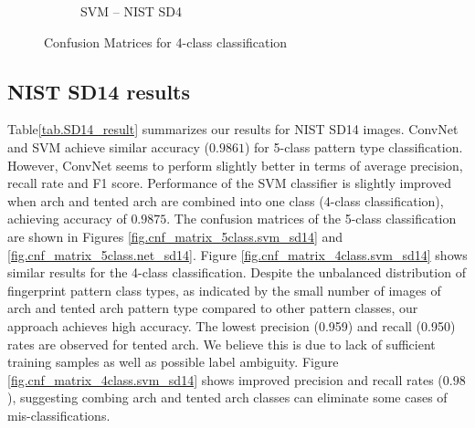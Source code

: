 \begin{figure}[!ht]
\begin{subfigure}[b]{0.25\textwidth}
		\caption{SVM -- NIST SD4}
		\label{fig.cnf_matrix_4class.svm_sd4}
	\end{subfigure}%

	\caption{Confusion Matrices for 4-class classification}\label{fig.cnf_matrix_4class}
\end{figure}

\subsection{NIST SD14 results}
\label{sec_sd14}

 Table\ref{tab.SD14_result} summarizes our results for NIST SD14 images.
%
ConvNet and SVM achieve similar accuracy ($0.9861$) for 5-class pattern type classification. 
%
However, ConvNet seems to perform slightly better in terms of average precision, recall rate and F1 score.
%
Performance of the SVM classifier is slightly improved when arch and tented arch are combined into one class (4-class classification), achieving accuracy of $0.9875$.
%
The confusion matrices of the 5-class classification are shown in Figures \ref{fig.cnf_matrix_5class.svm_sd14} and \ref{fig.cnf_matrix_5class.net_sd14}.
Figure \ref{fig.cnf_matrix_4class.svm_sd14} shows similar results for the 4-class classification.
%
Despite the unbalanced distribution of fingerprint pattern class types, as indicated by the small number of images of arch and tented arch pattern type compared to other pattern classes, our approach achieves high accuracy.
%
The lowest precision (0.959) and recall (0.950) rates are observed for tented arch.  We believe this is due to lack of sufficient training samples as well as possible label ambiguity.
%
Figure \ref{fig.cnf_matrix_4class.svm_sd14} shows improved precision and recall rates ($0.98$), suggesting combing arch and tented arch classes can eliminate some cases of mis-classifications.

